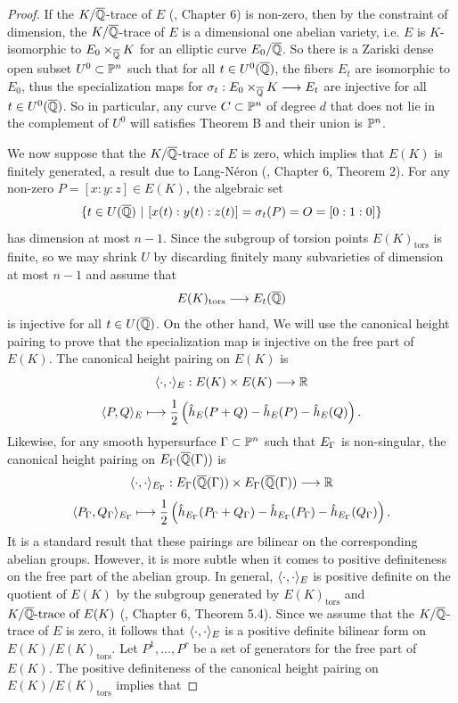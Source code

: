\documentclass[12pt,reqno]{amsart}
\begin{document}
\begin{proof}
If the $K/\overline{\mathbb{Q}}$-trace of $E$ (\cite{LFD}, Chapter 6) is non-zero, then by the constraint of dimension, the $K/\overline{\mathbb{Q}}$-trace of $E$ is a dimensional one abelian variety, i.e. $E$ is $K$-isomorphic to $E_0 \times_{\overline{\mathbb{Q}}} K$ for an elliptic curve $E_0/\overline{\mathbb{Q}}$. So there is a Zariski dense open subset $U^0 \subset \mathbb{P}^n$ such that for all $t \in U^0(\overline{\mathbb{Q}})$, the fibers $E_t$ are isomorphic to $E_0$, thus the specialization maps for $\sigma_t: E_0 \times_{\overline{\mathbb{Q}}} K \longrightarrow E_t$  are injective for all $t \in U^0(\overline{\mathbb{Q}})$. So in particular, any curve $C \subset \mathbb{P}^n$ of degree $d$ that does not lie in the complement of $U^0$ will satisfies Theorem B and their union is $\mathbb{P}^n$.

We now suppose that the $K/\overline{\mathbb{Q}}$-trace of $E$ is zero, which implies that $E(K)$ is finitely generated, a result due to Lang-N\'eron (\cite{LFD}, Chapter 6, Theorem 2). For any non-zero $P=[x:y:z] \in E(K)$, the algebraic set
$$ \{ t \in U(\CQ)\ | \ [x(t):y(t):z(t)]=\s_t(P)=O=[0:1:0] \}$$ has dimension at most $n-1$. Since the subgroup of torsion points $E(K)_{\text{tors}}$ is finite, so we may shrink $U$ by discarding finitely many subvarieties of dimension at most $n-1$ and assume that 
$$E(K)_{\text{tors}} \longrightarrow E_t(\overline{\mathbb{Q}}) $$
is injective for all $t \in  U(\overline{\mathbb{Q}})$. On the other hand, We will use the canonical height pairing to prove that the specialization map is injective on the free part of $E(K)$. The canonical height pairing on $E(K)$ is 
$$\langle \cdot  , \cdot \rangle_E : E(K) \times E(K) \longrightarrow \mathbb{R} $$
$$\langle P, Q\rangle_E \longmapsto \frac{1}{2}\left(\hat{h}_{E}(P+Q)-\hat{h}_{E}(P)-\hat{h}_{E}(Q) \right).$$
Likewise, for any smooth hypersurface $\Gamma \subset \mathbb{P}^n$ such that $E_\Gamma$ is non-singular, the canonical height pairing on $E_{\Gamma}(\overline{\mathbb{Q}}(\Gamma))$ is
$$\langle \cdot  , \cdot \rangle_{E_{\Gamma}} : E_{\Gamma}(\overline{\mathbb{Q}}(\Gamma)) \times E_{\Gamma}(\overline{\mathbb{Q}}(\Gamma)) \longrightarrow \mathbb{R} $$
$$\langle P_{\Gamma}, Q_{\Gamma}\rangle_{E_{\Gamma}} \longmapsto \frac{1}{2}\left(\hat{h}_{E_{\Gamma}}(P_{\Gamma}+Q_{\Gamma})-\hat{h}_{E_{\Gamma}}(P_{\Gamma})-\hat{h}_{E_{\Gamma}}(Q_{\Gamma}) \right).$$
It is a standard result that these pairings are bilinear on the corresponding abelian groups. However, it is more subtle when it comes to positive definiteness on the free part of the abelian group. In general, $\langle \cdot  , \cdot \rangle_E$ is positive definite on the quotient of $E(K)$ by the subgroup generated by $E(K)_\text{tors}$ and  $K/\overline{\mathbb{Q}}\text{-trace of }E(K)$ (\cite{LFD}, Chapter 6, Theorem 5.4). Since we assume that the $K/\overline{\mathbb{Q}}$-trace of $E$ is zero, it follows that $\langle \cdot  , \cdot \rangle_E$ is a positive definite bilinear form on $E(K)/E(K)_\text{tors}$. Let $P^1, \ldots, P^r$ be a set of generators for the free part of $E(K)$. The positive definiteness of the canonical height pairing on $E(K)/E(K)_\text{tors}$ implies that

\end{proof}
\end{document}
